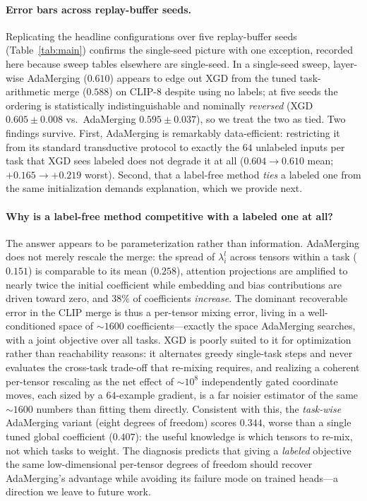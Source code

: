 \documentclass{article} %
\begin{document}
\paragraph{Error bars across replay-buffer seeds.}
Replicating the headline configurations over five replay-buffer seeds (Table~\ref{tab:main}) confirms the single-seed picture with one exception, recorded here because sweep tables elsewhere are single-seed. In a single-seed sweep, layer-wise AdaMerging ($0.610$) appears to edge out XGD from the tuned task-arithmetic merge ($0.588$) on CLIP-8 despite using no labels; at five seeds the ordering is statistically indistinguishable and nominally \emph{reversed} (XGD $0.605\pm0.008$ vs.\ AdaMerging $0.595\pm0.037$), so we treat the two as tied. Two findings survive. First, AdaMerging is remarkably data-efficient: restricting it from its standard transductive protocol to exactly the $64$ unlabeled inputs per task that XGD sees labeled does not degrade it at all ($0.604\to0.610$ mean; $+0.165\to+0.219$ worst). Second, that a label-free method \emph{ties} a labeled one from the same initialization demands explanation, which we provide next.

\paragraph{Why is a label-free method competitive with a labeled one at all?}
The answer appears to be parameterization rather than information. AdaMerging does not merely rescale the merge: the spread of $\lambda_i^l$ across tensors within a task ($0.151$) is comparable to its mean ($0.258$), attention projections are amplified to nearly twice the initial coefficient while embedding and bias contributions are driven toward zero, and $38\%$ of coefficients \emph{increase}. The dominant recoverable error in the CLIP merge is thus a per-tensor mixing error, living in a well-conditioned space of $\sim\!1600$ coefficients---exactly the space AdaMerging searches, with a joint objective over all tasks. XGD is poorly suited to it for optimization rather than reachability reasons: it alternates greedy single-task steps and never evaluates the cross-task trade-off that re-mixing requires, and realizing a coherent per-tensor rescaling as the net effect of $\sim\!10^8$ independently gated coordinate moves, each sized by a $64$-example gradient, is a far noisier estimator of the same $\sim\!1600$ numbers than fitting them directly. Consistent with this, the \emph{task-wise} AdaMerging variant (eight degrees of freedom) scores $0.344$, worse than a single tuned global coefficient ($0.407$): the useful knowledge is which tensors to re-mix, not which tasks to weight. The diagnosis predicts that giving a \emph{labeled} objective the same low-dimensional per-tensor degrees of freedom should recover AdaMerging's advantage while avoiding its failure mode on trained heads---a direction we leave to future work.
\end{document}
